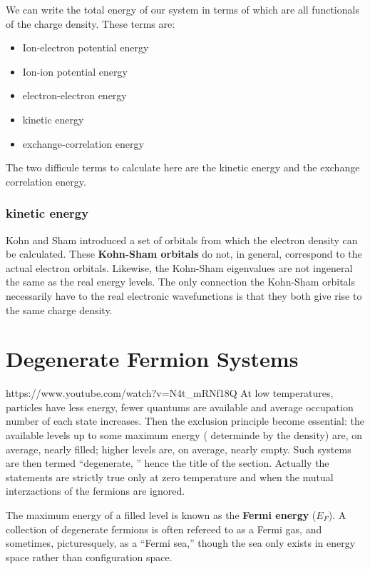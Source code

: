 \documentclass[a4paper, 11pt]{article}
\numberwithin{equation}{subsection}
\begin{document}
We can write the total energy of our system in terms of which are all functionals of the charge density. These terms are:

\begin{itemize}
  \item Ion-electron potential energy
  \item Ion-ion potential energy
  \item electron-electron energy
  \item kinetic energy
  \item exchange-correlation energy
\end{itemize}

The two difficule terms to calculate here are the kinetic energy and the exchange correlation energy.

\subsubsection{kinetic energy}

Kohn and Sham introduced a set of orbitals from which the electron density can be calculated. These \textbf{Kohn-Sham orbitals} do not, in general, correspond to the actual electron orbitals. Likewise, the Kohn-Sham eigenvalues  are not ingeneral the same as the real energy levels. The only connection the Kohn-Sham orbitals necessarily have to the real electronic wavefunctions is that they both give rise to the same charge density. 

\section{Degenerate Fermion Systems}
https://www.youtube.com/watch?v=N4t_mRNf18Q 
At low temperatures, particles have less energy, fewer quantums are available and average occupation number of each state increases. Then the exclusion principle become essential: the available levels up to some maximum energy ( determinde by the density) are, on average, nearly filled; higher levels are, on average, nearly empty. Such systems are then termed ``degenerate, '' hence the title of the section. Actually the statements are strictly true only at zero temperature and when the mutual interzactions of the fermions are ignored.

The maximum energy of a filled level is known as the \textbf{Fermi energy} ($E_F$). A collection of degenerate fermions is often refereed to as a Fermi gas, and sometimes, picturesquely, as a ``Fermi sea,'' though the sea only exists in energy space rather than configuration space. 
\end{document}
